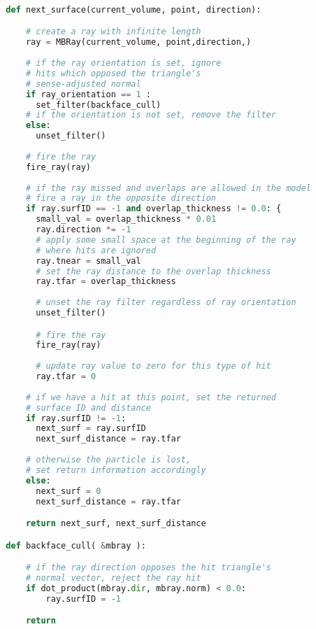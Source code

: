 \begin{lstlisting}[language=Python,basicstyle=\tiny,caption={Algorithm used in \textit{Next Surface} queries.},captionpos=b,label={alg:Next Surface Pseudo Code}]
  
  def next_surface(current_volume, point, direction):

      # create a ray with infinite length
      ray = MBRay(current_volume, point,direction,)
    
      # if the ray orientation is set, ignore
      # hits which opposed the triangle's
      # sense-adjusted normal
      if ray_orientation == 1 :
        set_filter(backface_cull)
      # if the orientation is not set, remove the filter
      else:
        unset_filter()
    
      # fire the ray
      fire_ray(ray)
    
      # if the ray missed and overlaps are allowed in the model
      # fire a ray in the opposite direction
      if ray.surfID == -1 and overlap_thickness != 0.0: {
        small_val = overlap_thickness * 0.01
        ray.direction *= -1
        # apply some small space at the beginning of the ray
        # where hits are ignored
        ray.tnear = small_val
        # set the ray distance to the overlap thickness
        ray.tfar = overlap_thickness
    
        # unset the ray filter regardless of ray orientation
        unset_filter()

        # fire the ray
        fire_ray(ray)
        
        # update ray value to zero for this type of hit
        ray.tfar = 0
    
      # if we have a hit at this point, set the returned
      # surface ID and distance
      if ray.surfID != -1:
        next_surf = ray.surfID
        next_surf_distance = ray.tfar
        
      # otherwise the particle is lost,
      # set return information accordingly
      else:
        next_surf = 0
        next_surf_distance = ray.tfar

      return next_surf, next_surf_distance

  def backface_cull( &mbray ):

      # if the ray direction opposes the hit triangle's
      # normal vector, reject the ray hit
      if dot_product(mbray.dir, mbray.norm) < 0.0:
          ray.surfID = -1

      return

\end{lstlisting}

